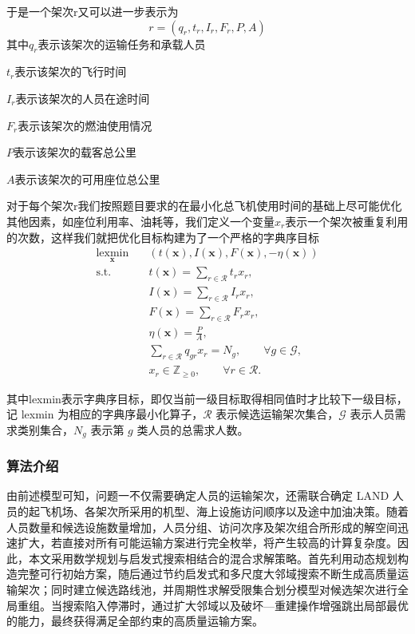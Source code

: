 \documentclass[UTF-8,a4paper,zihao=-4]{ctexart}
\begin{document}
于是一个架次r又可以进一步表示为
\begin{equation}
    r=(q_r,t_r,I_r,F_r,P,A)
\end{equation}
其中$q_r$表示该架次的运输任务和承载人员

$t_r$表示该架次的飞行时间

$I_r$表示该架次的人员在途时间

$F_r$表示该架次的燃油使用情况

$P$表示该架次的载客总公里

$A$表示该架次的可用座位总公里

对于每个架次r我们按照题目要求的在最小化总飞机使用时间的基础上尽可能优化其他因素，如座位利用率、油耗等，我们定义一个变量$x_r$表示一个架次被重复利用的次数，这样我们就把优化目标构建为了一个严格的字典序目标
\begin{equation}
\begin{aligned}
\underset{\boldsymbol{x}}{\operatorname{lexmin}}
\quad &
\left(
t(\boldsymbol{x}),
I(\boldsymbol{x}),
F(\boldsymbol{x}),
-\eta(\boldsymbol{x})
\right)
\\[2mm]
\text{s.t.}\quad
&
t(\boldsymbol{x})
=
\sum_{r\in\mathcal{R}} t_r x_r,
\\
&
I(\boldsymbol{x})
=
\sum_{r\in\mathcal{R}} I_r x_r,
\\
&
F(\boldsymbol{x})
=
\sum_{r\in\mathcal{R}} F_r x_r,
\\
&
\eta(\boldsymbol{x})
=
\frac{P}
     {A},
\\
&
\sum_{r\in\mathcal{R}} q_{gr}x_r
=
N_g,
\qquad \forall g\in\mathcal{G},
\\
&
x_r\in\mathbb{Z}_{\ge 0},
\qquad \forall r\in\mathcal{R}.
\end{aligned}
\label{eq:q1_lex_model}
\end{equation}

其中lexmin表示字典序目标，即仅当前一级目标取得相同值时才比较下一级目标，记 lexmin 为相应的字典序最小化算子，$\mathcal{R}$ 表示候选运输架次集合，$\mathcal{G}$ 表示人员需求类别集合，$N_g$ 表示第 $g$ 类人员的总需求人数。
\subsubsection{算法介绍}
由前述模型可知，问题一不仅需要确定人员的运输架次，还需联合确定 LAND 人员的起飞机场、各架次所采用的机型、海上设施访问顺序以及途中加油决策。随着人员数量和候选设施数量增加，人员分组、访问次序及架次组合所形成的解空间迅速扩大，若直接对所有可能运输方案进行完全枚举，将产生较高的计算复杂度。因此，本文采用数学规划与启发式搜索相结合的混合求解策略。首先利用动态规划构造完整可行初始方案，随后通过节约启发式和多尺度大邻域搜索不断生成高质量运输架次；同时建立候选路线池，并周期性求解受限集合划分模型对候选架次进行全局重组。当搜索陷入停滞时，通过扩大邻域以及破坏—重建操作增强跳出局部最优的能力，最终获得满足全部约束的高质量运输方案。
\end{document}

